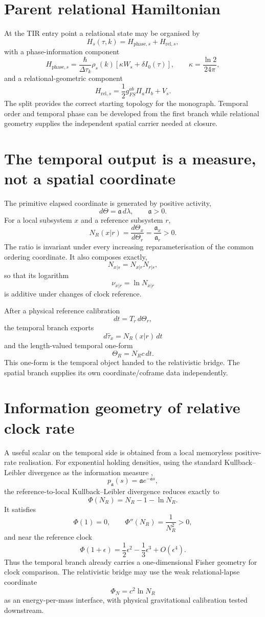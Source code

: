 \documentclass[11pt]{book}
\begin{document}
\section{Parent relational Hamiltonian}

At the TIR entry point a relational state may be organised by
\[
H_s(\tau,k)=H_{\mathrm{phase},s}+H_{\mathrm{rel},s},
\]
with a phase-information component
\[
H_{\mathrm{phase},s}
=
\frac{\hbar}{\Delta\tau_k}\rho_s(k)
\left[\kappa W_s+\delta I_0(\tau)\right],
\qquad
\kappa=\frac{\ln2}{24\pi},
\]
and a relational-geometric component
\[
H_{\mathrm{rel},s}
=
\frac12 g_{FS}^{ab}\Pi_a\Pi_b+V_s.
\]
The split provides the correct starting topology for the monograph. Temporal order and temporal phase can be developed from the first branch while relational geometry supplies the independent spatial carrier needed at closure.

\section{The temporal output is a measure, not a spatial coordinate}

The primitive elapsed coordinate is generated by positive activity,
\[
d\Theta=\mathfrak a\,d\lambda,
\qquad \mathfrak a>0.
\]
For a local subsystem \(x\) and a reference subsystem \(r\),
\[
N_R(x|r)
=
\frac{d\Theta_x}{d\Theta_r}
=
\frac{\mathfrak a_x}{\mathfrak a_r}>0.
\]
The ratio is invariant under every increasing reparameterisation of the common ordering coordinate. It also composes exactly,
\[
N_{x|s}=N_{x|r}N_{r|s},
\]
so that its logarithm
\[
\nu_{x|r}=\ln N_{x|r}
\]
is additive under changes of clock reference.

After a physical reference calibration
\[
dt=T_r\,d\Theta_r,
\]
the temporal branch exports
\[
d\widehat\tau_x=N_R(x|r)\,dt
\]
and the length-valued temporal one-form
\[
\boxed{
\Theta_R=N_Rc\,dt.
}
\]
This one-form is the temporal object handed to the relativistic bridge. The spatial branch supplies its own coordinate/coframe data independently.

\section{Information geometry of relative clock rate}

A useful scalar on the temporal side is obtained from a local memoryless positive-rate realisation. For exponential holding densities, using the standard Kullback--Leibler divergence as the information measure \cite{KullbackLeibler1951},
\[
p_{\mathfrak a}(s)=\mathfrak a e^{-\mathfrak a s},
\]
the reference-to-local Kullback--Leibler divergence reduces exactly to
\[
\boxed{
\Phi(N_R)=N_R-1-\ln N_R.
}
\]
It satisfies
\[
\Phi(1)=0,
\qquad
\Phi''(N_R)=\frac{1}{N_R^2}>0,
\]
and near the reference clock
\[
\Phi(1+\epsilon)
=
\frac12\epsilon^2-\frac13\epsilon^3+O(\epsilon^4).
\]
Thus the temporal branch already carries a one-dimensional Fisher geometry for clock comparison. The relativistic bridge may use the weak relational-lapse coordinate
\[
\Phi_N=c^2\ln N_R
\]
as an energy-per-mass interface, with physical gravitational calibration tested downstream.
\end{document}
